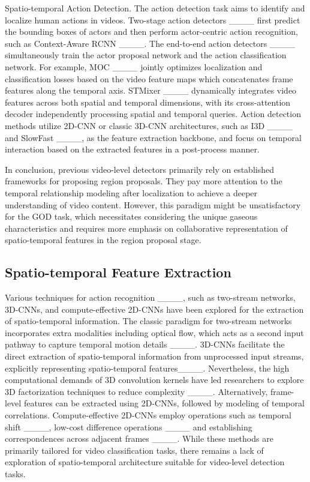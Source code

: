Spatio-temporal Action Detection. The action detection task aims to identify and localize human actions in videos. Two-stage action detectors ____ first predict the bounding boxes of actors and then perform actor-centric action recognition, such as Context-Aware RCNN ____.
The end-to-end action detectors ____ simultaneously train the actor proposal network and the action classification network. For example, MOC ____ jointly optimizes localization and classification losses based on the video feature maps which concatenates frame features along the temporal axis. STMixer ____ dynamically integrates video features across both spatial and temporal dimensions, with its cross-attention decoder independently processing spatial and temporal queries. Action detection methods utilize 2D-CNN or classic 3D-CNN architectures, such as I3D ____ and SlowFast ____, as the feature extraction backbone, and focus on temporal interaction based on the extracted features in a post-process manner.

In conclusion, previous video-level detectors primarily rely on established frameworks for proposing region proposals. They pay more attention to the temporal relationship modeling after localization to achieve a deeper understanding of video content. However, this paradigm might be unsatisfactory for the GOD task, which necessitates considering the unique gaseous characteristics and requires more emphasis on collaborative representation of spatio-temporal features in the region proposal stage. 

\subsection{Spatio-temporal Feature Extraction}

Various techniques for action recognition ____, such as two-stream networks, 3D-CNNs, and compute-effective 2D-CNNs have been explored for the extraction of spatio-temporal information. The classic paradigm for two-stream networks incorporates extra modalities including optical flow, which acts as a second input pathway to capture temporal motion details ____. 3D-CNNs facilitate the direct extraction of spatio-temporal information from unprocessed input streams, explicitly representing spatio-temporal features____. Nevertheless, the high computational demands of 3D convolution kernels have led researchers to explore 3D factorization techniques to reduce complexity ____. Alternatively, frame-level features can be extracted using 2D-CNNs, followed by modeling of temporal correlations. Compute-effective 2D-CNNs employ operations such as temporal shift ____, low-cost difference operations ____ and establishing correspondences across adjacent frames ____. While these methods are primarily tailored for video classification tasks, there remains a lack of exploration of spatio-temporal architecture suitable for video-level detection tasks.

